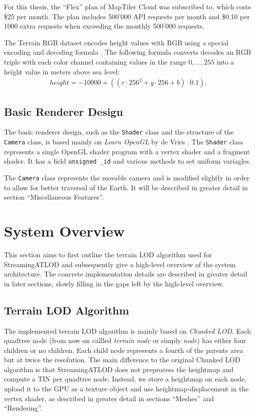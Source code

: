 For this thesis, the ``Flex'' plan of MapTiler Cloud was subscribed to,
which costs \$25 per month.
The plan includes 500'000 API requests per month and \$0.10 per 1000 extra requests when exceeding
the monthly 500'000 requests.

The Terrain RGB dataset encodes height values with RGB using a special encoding and decoding formula \cite{maptilerterrainrgb}. The following 
formula converts decodes an RGB triple with each color channel containing values in the range $0,\dots,255$ 
into a height value in meters above sea level:
\begin{align*}
  height = -10000 + ((r \cdot 256^2 + g \cdot 256 + b) \cdot 0.1).
\end{align*}

\subsection{Basic Renderer Design}
The basic renderer design, such as the \texttt{Shader} class and
the structure of the \texttt{Camera} class, 
is based mainly 
on \textit{Learn OpenGL} by de Vries \cite{learnopengl}.
The \texttt{Shader} class represents a single 
OpenGL shader program with a vertex shader and a fragment shader.
It has a field \texttt{unsigned \_id} and various 
methods to set uniform variagles.

The \texttt{Camera} class represents the movable camera and 
is modified slightly in order to allow for better traversal of the Earth.
It will be described in greater detail in section ``Miscellaneous Features''.

\section{System Overview}
This section aims to first outline the terrain LOD algorithm used for StreamingATLOD 
and subsequently give a high-level overview of the system architecture.
The concrete implementation details are described in greater detail in later sections,
slowly filling in the gaps left by the high-level overview.

\subsection{Terrain LOD Algorithm}
The implemented terrain LOD algorithm is mainly based on \textit{Chunked LOD}\cite{chunkedlod}.
Each quadtree node (from now on callled \textit{terrain node} or simply \textit{node}) has either four children or 
no children. Each child node represents a fourth of the parents area 
but at twice the resolution.
The main difference to the original Chunked LOD algorithm is that StreamingATLOD does not 
preprocess the heightmap and compute a TIN per quadtree node. Instead, we 
store a heightmap on each node, upload it to the GPU 
as a texture object and 
use heightmap-displacement in the vertex shader, as described in greater detail 
in sections ``Meshes'' and ``Rendering''.

